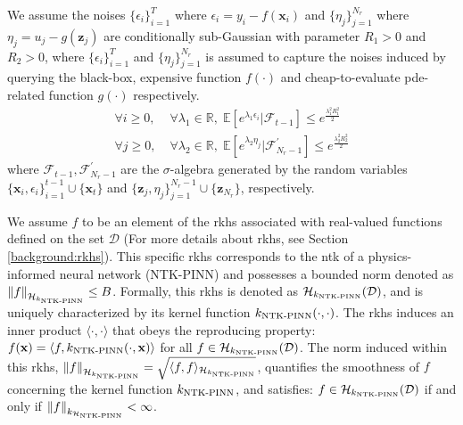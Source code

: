  \begin{assumption}
 \label{assumption:pinn-bo_subgaussian}
 We assume the noises $\{\epsilon_i\}_{i=1}^T$ where $\epsilon_i = y_i - f(\mathbf{x}_i)$ and $\{\eta_j\}_{j=1}^{N_r}$ where $\eta_j = u_j - g(\mathbf{z}_j)$  are conditionally sub-Gaussian with parameter $R_1 > 0$ and $R_2 >0$, where $\{\epsilon_i\}_{i=1}^T$ and $\{\eta_j\}_{j=1}^{N_r}$ is assumed to capture the noises induced by querying the black-box, expensive function $f(\cdot)$  and cheap-to-evaluate \ac{pde}-related function $g(\cdot)$ respectively. 
 \begin{equation*}
     \begin{split}
         \forall i \ge 0, & \; \forall \lambda_1 \in \mathbb{R}, \;  \mathbb{E}[e^{\lambda_1\epsilon_i} \rvert \mathcal{F}_{t-1}] \le e^\frac{\lambda_1^2 R_1^2}{2} \\
         \forall j \ge 0, & \; \forall \lambda_2 \in \mathbb{R}, \;  \mathbb{E}[e^{\lambda_2\eta_j} \rvert \mathcal{F}_{N_r-1}^\prime] \le e^\frac{\lambda_2^2 R_2^2}{2}
     \end{split}
 \end{equation*}
where $\mathcal{F}_{t-1}, \mathcal{F}_{N_r-1}^\prime$ are the $\sigma$-algebra generated by the random variables $\{\mathbf{x}_i, \epsilon_i\} 
^{t-1}_{i=1} \cup \{\mathbf{x}_t\}$ and $\{\mathbf{z}_j, \eta_j\} 
^{N_r-1}_{j=1} \cup \{\mathbf{z}_{N_r}\}$, respectively.
 \end{assumption}
 \begin{assumption}
    \label{assumption:pinn-bo_rkhs}
     We assume $f$ to be an element of the \acf{rkhs} associated with real-valued functions defined on the set $\mathcal{D}$ (For more details about \ac{rkhs}, see Section \ref{background:rkhs}). This specific \ac{rkhs} corresponds to the \acf{ntk} of a physics-informed neural network (NTK-PINN) and possesses a bounded norm denoted as $\norm{f}_{\mathcal{H}_{k_\textup{NTK-PINN}}} \leq B$.  Formally, this \ac{rkhs} is denoted as $\mathcal{H}_{k_\textup{NTK-PINN}}(\mathcal D)$, and is uniquely characterized by its kernel function $k_\textup{NTK-PINN}(\cdot, \cdot)$. The \ac{rkhs} induces an inner product $\langle \cdot, \cdot \rangle$ that obeys the reproducing property:
    $f(\mathbf{x}) = \langle f, k_\textup{NTK-PINN}(\cdot, \mathbf{x})\rangle$ for all $f \in  \mathcal{H}_{k_\textup{NTK-PINN}}(\mathcal{D})$. 
    The norm induced within this \ac{rkhs}, $\norm{f}_{\mathcal{H}_{k_\textup{NTK-PINN}}} = \sqrt{\langle f,f\rangle_{\mathcal{H}_{k_\textup{NTK-PINN}}}}$, quantifies the smoothness of $f$ concerning the kernel function $k_\textup{NTK-PINN}$, and satisfies: $f \in \mathcal{H}_{k_\textup{NTK-PINN}}(\mathcal{D})$ if and only if $\norm{f}_{k_{\mathcal{H}_\textup{NTK-PINN}}} < \infty$. 
 \end{assumption}


